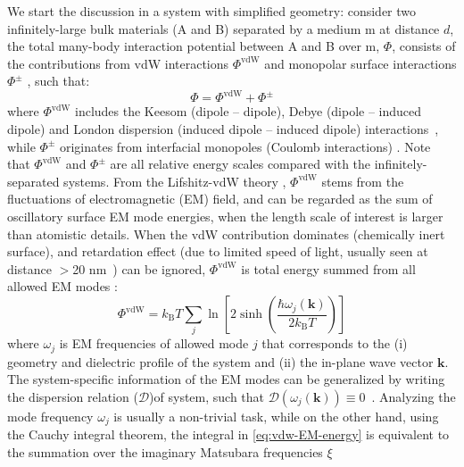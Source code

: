 We start the discussion in a system with simplified geometry: consider
two infinitely-large bulk materials (A and B) separated by a medium m
at distance \(d\), the total many-body interaction potential between A
and B over m, \(\Phi\), consists of the contributions from vdW
interactions \(\Phi^{\mathrm{vdW}}\) and mono\-polar surface
interactions \(\Phi^{\pm}\)
\cite{van_Oss_1987_monopolar,Van_Oss_1988}, such that:
\begin{equation}
\label{eq:vdw-phi-oss}
\Phi = \Phi^{\mathrm{vdW}} + \Phi^{\pm}
\end{equation}
where \(\Phi^{\mathrm{vdW}}\) includes the Keesom (dipole -- dipole),
Debye (dipole -- induced dipole) and London dispersion (induced dipole
-- induced dipole) interactions~\cite{Israelachvili_2011_book}, while
\(\Phi^{\pm}\) originates from interfacial monopoles (Coulomb
interactions) \cite{van_Oss_1987_monopolar}.
%
Note that $\Phi^{\mathrm{vdW}}$ and $\Phi^{\pm}$ are all relative
energy scales compared with the infinitely-separated systems.
%
From the Lifshitz-vdW theory \cite{Dzyaloshinskii_1961_lifshitz},
\(\Phi^{\mathrm{vdW}}\) stems from the fluctuations of electromagnetic
(EM) field, and can be regarded as the sum of oscillatory surface EM
mode energies, when the length scale of interest is larger than
atomistic details.
%
When the vdW contribution dominates (\ie chemically inert surface),
and retardation effect (due to limited speed of light, usually seen at
distance $>$20 nm~\cite{parsegian_van_2010_book}) can be ignored,
$\Phi^{\mathrm{vdW}}$ is total energy summed from all allowed EM modes
\cite{Li_2005_diele}:
\begin{equation}
\label{eq:vdw-EM-energy}
\Phi^{\mathrm{vdW}} = k_{\mathrm{B}} T \sum_{j} \ln \left[2 \sinh\left(\frac{\hbar \omega_{j}(\mathbf{k})}{2 k_{\mathrm{B}} T}\right)\right] 
\end{equation}
where \(\omega_{j}\) is EM frequencies of allowed mode $j$ that
corresponds to the (i) geometry and dielectric profile of the system
and (ii) the in-plane wave vector \(\mathbf{k}\).
%
The system-specific information of the EM modes can be generalized by
writing the dispersion relation ($\mathcal{D}$)of system, such that
\(\mathcal{D}(\omega_{j}(\mathbf{k})) \equiv
0\)~\cite{Guttinger_1966_dispersion,Mahanty_1976_dispersion_book}.
%
Analyzing the mode frequency \(\omega_{j}\) is usually a non-trivial
task, while on the other hand, using the Cauchy integral theorem, the
integral in \autoref{eq:vdw-EM-energy} is equivalent to the summation
over the imaginary Matsubara frequencies $\xi$
